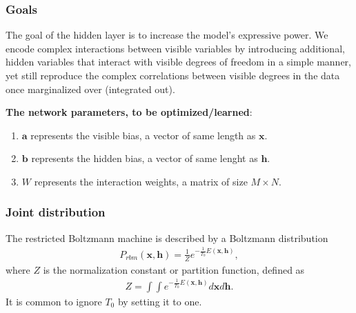 \documentclass{beamer}
\begin{document}
\begin{frame}
\frametitle{Goals}

The goal of the hidden layer is to increase the model's expressive
power. We encode complex interactions between visible variables by
introducing additional, hidden variables that interact with visible
degrees of freedom in a simple manner, yet still reproduce the complex
correlations between visible degrees in the data once marginalized
over (integrated out).

\textbf{The network parameters, to be optimized/learned}:
\begin{enumerate}
 \item $\mathbf{a}$ represents the visible bias, a vector of same length as $\mathbf{x}$.

 \item $\mathbf{b}$ represents the hidden bias, a vector of same lenght as $\mathbf{h}$.

 \item $W$ represents the interaction weights, a matrix of size $M\times N$.
\end{enumerate}

\noindent
\end{frame}

\begin{frame}
\frametitle{Joint distribution}

The restricted Boltzmann machine is described by a Boltzmann distribution
\begin{align}
	P_{rbm}(\mathbf{x},\mathbf{h}) = \frac{1}{Z} e^{-\frac{1}{T_0}E(\mathbf{x},\mathbf{h})},
\end{align}
where $Z$ is the normalization constant or partition function, defined as 
\begin{align}
	Z = \int \int e^{-\frac{1}{T_0}E(\mathbf{x},\mathbf{h})} d\mathbf{x} d\mathbf{h}.
\end{align}
It is common to ignore $T_0$ by setting it to one.
\end{frame}
\end{document}
